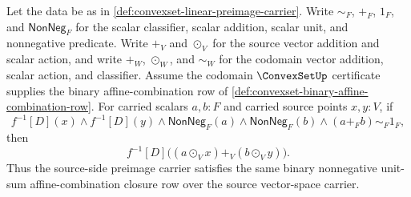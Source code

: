 \begin{theorem}
\label{thm:convexset-linear-preimage-affine-combination-closure}
Let the data be as in \autoref{def:convexset-linear-preimage-carrier}. Write $\sim_F$, $+_F$, $1_F$, and $\mathsf{NonNeg}_F$ for the scalar classifier, scalar addition, scalar unit, and nonnegative predicate. Write $+_V$ and $\odot_V$ for the source vector addition and scalar action, and write $+_W$, $\odot_W$, and $\sim_W$ for the codomain vector addition, scalar action, and classifier. Assume the codomain $\ConvexSetUp$ certificate supplies the binary affine-combination row of \autoref{def:convexset-binary-affine-combination-row}. For carried scalars $a,b:F$ and carried source points $x,y:V$, if
$$
f^{-1}[D](x)\land f^{-1}[D](y)\land
\mathsf{NonNeg}_F(a)\land\mathsf{NonNeg}_F(b)\land
(a+_F b)\sim_F1_F,
$$
then
$$
f^{-1}[D]\bigl((a\odot_V x)+_V(b\odot_V y)\bigr).
$$
Thus the source-side preimage carrier satisfies the same binary nonnegative unit-sum affine-combination closure row over the source vector-space carrier.
\end{theorem}
